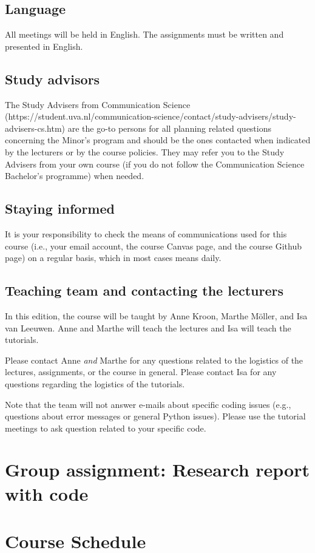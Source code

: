 \documentclass[a4paper,10pt]{report}
\begin{document}
\section{Language}
All meetings will be held in English. The assignments must be written and presented in English. 

\section{Study advisors}
The Study Advisers from Communication Science (https://student.uva.nl/communication-science/contact/study-advisers/study-advisers-cs.htm) are the go-to persons for all planning related questions concerning the Minor’s program and should be the ones contacted when indicated by the lecturers or by the course policies. They may refer you to the Study Advisers from your own course (if you do not follow the Communication Science Bachelor’s programme) when needed. 

\section{Staying informed}
It is your responsibility to check the means of communications used for this course (i.e., your email account, the course Canvas page, and the course Github page) on a regular basis, which in most cases means daily. 

\section{Teaching team and contacting the lecturers}
In this edition, the course will be taught by Anne Kroon, Marthe Möller, and Isa van Leeuwen. Anne and Marthe will teach the lectures and Isa will teach the tutorials.

Please contact Anne \emph{and} Marthe for any questions related to the logistics of the lectures, assignments, or the course in general.
Please contact Isa for any questions regarding the logistics of the tutorials. 

Note that the team will not answer e-mails about specific coding issues (e.g., questions about error messages or general Python issues). Please use the tutorial meetings to ask question related to your specific code.

\chapter{Group assignment: Research report with code}
\label{sec:groupassignment}


\chapter{Course Schedule}





\end{document}
